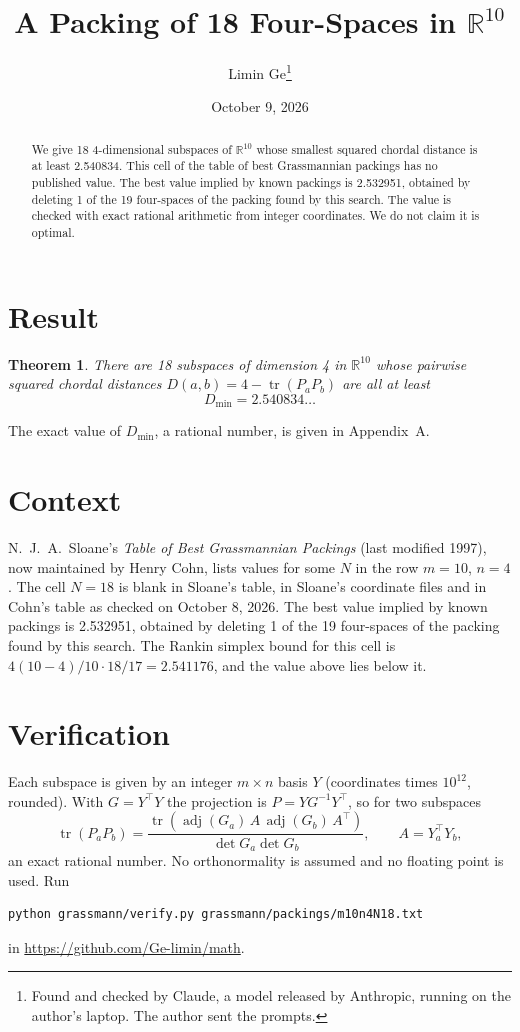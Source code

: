 \documentclass[11pt,a4paper]{article}
\title{A Packing of 18 Four-Spaces in $\mathbb{R}^{10}$}
\author{Limin Ge\thanks{Found and checked by Claude, a model released by Anthropic, running on the author's laptop. The author sent the prompts.}}
\date{October 9, 2026}
\newtheorem*{theorem}{Theorem}
\begin{document}
\maketitle
\begin{abstract}
We give 18 4-dimensional subspaces of $\mathbb{R}^{10}$ whose smallest squared chordal distance is at least 2.540834. This cell of the table of best Grassmannian packings has no published value. The best value implied by known packings is 2.532951, obtained by deleting 1 of the 19 four-spaces of the packing found by this search. The value is checked with exact rational arithmetic from integer coordinates. We do not claim it is optimal.
\end{abstract}

\section{Result}
\begin{theorem}
There are 18 subspaces of dimension 4 in $\mathbb{R}^{10}$ whose pairwise squared chordal distances $D(a,b) = 4 - \operatorname{tr}(P_aP_b)$ are all at least
\[ D_{\min} = 2.540834\ldots \]
\end{theorem}
The exact value of $D_{\min}$, a rational number, is given in Appendix~A.


\section{Context}
N.~J.~A.~Sloane's \emph{Table of Best Grassmannian Packings} (last modified 1997), now maintained by Henry Cohn, lists values for some $N$ in the row $m=10$, $n=4$. The cell $N=18$ is blank in Sloane's table, in Sloane's coordinate files and in Cohn's table as checked on October 8, 2026. The best value implied by known packings is 2.532951, obtained by deleting 1 of the 19 four-spaces of the packing found by this search. The Rankin simplex bound for this cell is $4(10-4)/10\cdot 18/17 = 2.541176$, and the value above lies below it.


\section{Verification}
Each subspace is given by an integer $m\times n$ basis $Y$ (coordinates times $10^{12}$, rounded). With $G=Y^\top Y$ the projection is $P=YG^{-1}Y^\top$, so for two subspaces
\[ \operatorname{tr}(P_aP_b)=\frac{\operatorname{tr}(\operatorname{adj}(G_a)\,A\,\operatorname{adj}(G_b)\,A^\top)}{\det G_a\det G_b},\qquad A=Y_a^\top Y_b, \]
an exact rational number. No orthonormality is assumed and no floating point is used. Run
\begin{verbatim}
python grassmann/verify.py grassmann/packings/m10n4N18.txt
\end{verbatim}
in \url{https://github.com/Ge-limin/math}.
\end{document}
